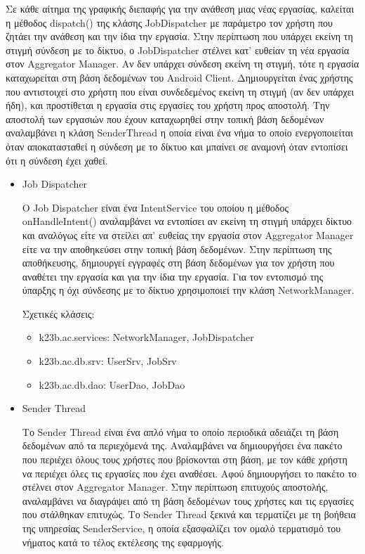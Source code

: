 \documentclass[a4paper,11pt]{article}
\begin{document}
\begin{sloppypar}
Σε κάθε αίτημα της γραφικής διεπαφής για την ανάθεση μιας νέας εργασίας, καλείται η μέθοδος dispatch() της κλάσης JobDispatcher με παράμετρο τον χρήστη που ζητάει την ανάθεση και την ίδια την εργασία. Στην περίπτωση που υπάρχει εκείνη τη στιγμή σύνδεση με το δίκτυο, ο JobDispatcher στέλνει κατ' ευθείαν τη νέα εργασία στον Aggregator Manager. Αν δεν υπάρχει σύνδεση εκείνη τη στιγμή, τότε η εργασία καταχωρείται στη βάση δεδομένων του Android Client. Δημιουργείται ένας χρήστης που αντιστοιχεί στο χρήστη που είναι συνδεδεμένος εκείνη τη στιγμή (αν δεν υπάρχει ήδη), και προστίθεται η εργασία στις εργασίες του χρήστη προς αποστολή. Την αποστολή των εργασιών που έχουν καταχωρηθεί στην τοπική βάση δεδομένων αναλαμβάνει η κλάση SenderThread η οποία είναι ένα νήμα το οποίο ενεργοποιείται όταν αποκατασταθεί η σύνδεση με το δίκτυο και μπαίνει σε αναμονή όταν εντοπίσει ότι η σύνδεση έχει χαθεί.

\begin{itemize}

\item{Job Dispatcher}

Ο Job Dispatcher είναι ένα IntentService του οποίου η μέθοδος onHandleIntent() αναλαμβάνει να εντοπίσει αν εκείνη τη στιγμή υπάρχει δίκτυο και αναλόγως είτε να στείλει απ' ευθείας την εργασία στον Aggregator Manager είτε να την αποθηκεύσει στην τοπική βάση δεδομένων. Στην περίπτωση της αποθήκευσης, δημιουργεί εγγραφές στη βάση δεδομένων για τον χρήστη που αναθέτει την εργασία και για την ίδια την εργασία. Για τον εντοπισμό της ύπαρξης η όχι σύνδεσης με το δίκτυο χρησιμοποιεί την κλάση NetworkManager.

Σχετικές κλάσεις:

\begin{itemize}

\item k23b.ac.services: NetworkManager, JobDispatcher

\item k23b.ac.db.srv: UserSrv, JobSrv

\item k23b.ac.db.dao: UserDao, JobDao

\end{itemize}

\item{Sender Thread}

Το Sender Thread είναι ένα απλό νήμα το οποίο περιοδικά αδειάζει τη βάση δεδομένων από τα περιεχόμενά της. Αναλαμβάνει να δημιουργήσει ένα πακέτο που περιέχει όλους τους χρήστες που βρίσκονται στη βάση, με τον κάθε χρήστη να περιέχει όλες τις εργασίες που έχει αναθέσει. Αφού δημιουργήσει το πακέτο το στέλνει στον Aggregator Manager. Στην περίπτωση επιτυχούς αποστολής, αναλαμβάνει να διαγράψει από τη βάση δεδομένων τους χρήστες και τις εργασίες που στάλθηκαν επιτυχώς. Το Sender Thread ξεκινά και τερματίζει με τη βοήθεια της υπηρεσίας SenderService, η οποία εξασφαλίζει τον ομαλό τερματισμό του νήματος κατά το τέλος εκτέλεσης της εφαρμογής.


\end{itemize}
\end{sloppypar}
\end{document}
